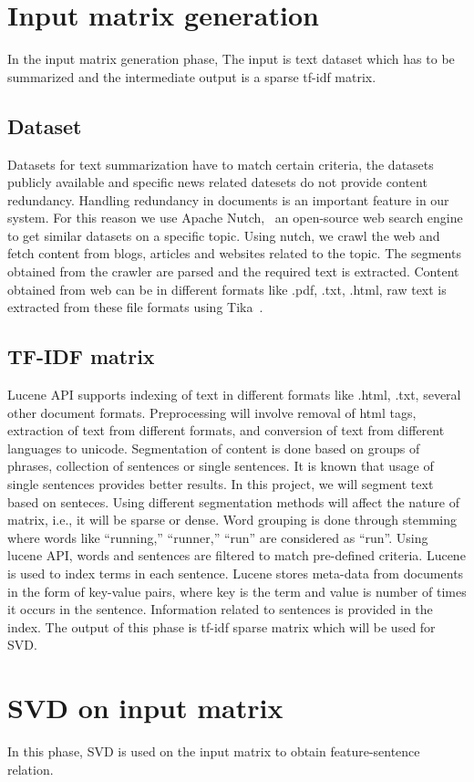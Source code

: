 \section{Input matrix generation}
In the input matrix generation phase, The input is text dataset which has to be summarized and the intermediate output is
a sparse tf-idf matrix.
\subsection{Dataset}
Datasets for text summarization have to match certain criteria, the datasets publicly available and specific news related
datesets do not provide content redundancy. Handling redundancy in documents is an important feature in our system. For this reason
we use Apache Nutch,~\cite{nutch} an open-source web search engine to get similar datasets on a specific topic. Using nutch, we crawl the web
and fetch content from blogs, articles and websites related to the topic. The segments obtained from the crawler are parsed and the required
text is extracted. Content obtained from web can be in different formats like .pdf, .txt, .html, raw text is extracted from these file formats using
Tika~\cite{tika}.
\subsection{TF-IDF matrix}
Lucene API supports indexing of text in different formats like .html, .txt, several other document formats.
Preprocessing will involve removal of html tags, extraction of text from different formats, and conversion of text from different
languages to unicode. Segmentation of content is done based on groups of phrases, collection of sentences or single sentences. 
It is known that usage of single sentences provides better results. In this project, we will segment text based on senteces.
Using different segmentation methods will affect the nature of matrix, i.e., it will be sparse or dense. Word grouping is done through 
stemming where words like ``running,'' ``runner,'' ``run'' are considered as ``run''.
Using lucene API, words and sentences are filtered to match pre-defined criteria.
Lucene is used to index terms in each sentence. Lucene stores meta-data from documents in the form of 
key-value pairs, where key is the term and value is number of times it occurs in the sentence. Information related to sentences is
provided in the index.
The output of this phase is tf-idf sparse matrix which will be used for SVD.
\section{SVD on input matrix}
In this phase, SVD is used on the input matrix to obtain feature-sentence relation.
